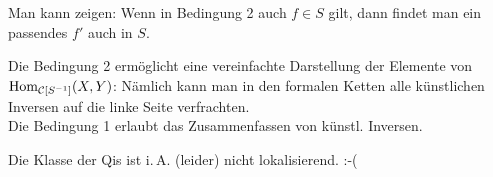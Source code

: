 \documentclass{cheat-sheet}
\begin{document}
\begin{bem}
  Man kann zeigen: Wenn in Bedingung 2 auch $f \in S$ gilt, dann findet man ein passendes $f'$ auch in $S$.
\end{bem}

\begin{bem}
  Die Bedingung 2 ermöglicht eine vereinfachte Darstellung der Elemente von $\operatorname{Hom}_{\mathcal{C}[S^{-1}]}(X, Y)$: Nämlich kann man in den formalen Ketten alle künstlichen Inversen auf die linke Seite verfrachten. \\
  Die Bedingung 1 erlaubt das Zusammenfassen von künstl. Inversen.
\end{bem}

\begin{bem}
  Die Klasse der Qis ist i.\,A. (leider) nicht lokalisierend. :-(
\end{bem}
\end{document}
